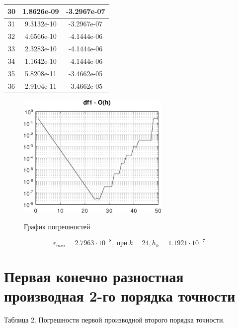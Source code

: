 \documentclass{article}
\begin{document}
			\begin{table}[h!]
				\centering
					\begin{tabular}{|l|l|l|}
						\hline
						
						\multicolumn{1}{|c|}{30} & \multicolumn{1}{c|}{1.8626e-09} & \multicolumn{1}{c|}{-3.2967e-07} \\ \hline
						\multicolumn{1}{|c|}{31} & \multicolumn{1}{c|}{9.3132e-10} & \multicolumn{1}{c|}{-3.2967e-07} \\ \hline
						\multicolumn{1}{|c|}{32} & \multicolumn{1}{c|}{4.6566e-10} & \multicolumn{1}{c|}{-4.1444e-06} \\ \hline
						\multicolumn{1}{|c|}{33} & \multicolumn{1}{c|}{2.3283e-10} & \multicolumn{1}{c|}{-4.1444e-06} \\ \hline
						\multicolumn{1}{|c|}{34} & \multicolumn{1}{c|}{1.1642e-10} & \multicolumn{1}{c|}{-4.1444e-06} \\ \hline
						\multicolumn{1}{|c|}{35} & \multicolumn{1}{c|}{5.8208e-11} & \multicolumn{1}{c|}{-3.4662e-05} \\ \hline
						\multicolumn{1}{|c|}{36} & \multicolumn{1}{c|}{2.9104e-11} & \multicolumn{1}{c|}{-3.4662e-05} \\ \hline
					\end{tabular}
			\end{table}
		
		\begin{figure}[h!] 
			\centering
			\renewcommand{\figurename}{Рисунок}
			\includegraphics [width=0.65\textwidth]{../img/df1}\\ 
			\caption{График погрешностей  \label{fig.1}}
		\end{figure}
	
	
	\[r_{min} = 2.7963\cdot 10^{-8},~ \text{при} ~ k=24, h_k=1.1921\cdot 10^{-7}\]
	\newpage
	
	\section{Первая конечно разностная производная 2-го порядка точности}
		\begin{flushright}
			Таблица 2. Погрешности первой производной второго порядка точности.
		\end{flushright}
		
\end{document}

